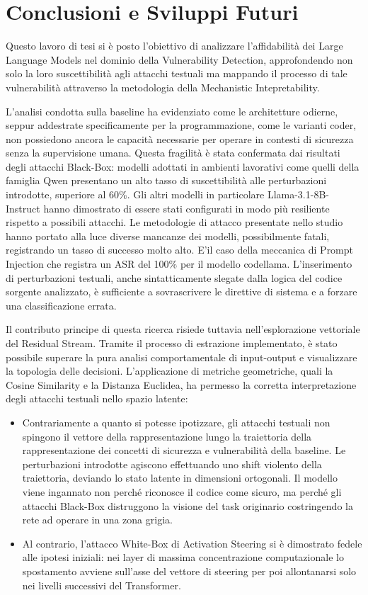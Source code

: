 \chapter{Conclusioni e Sviluppi Futuri}
Questo lavoro di tesi si è posto l'obiettivo di analizzare l'affidabilità dei Large Language Models nel dominio della Vulnerability Detection, approfondendo non solo la loro suscettibilità agli attacchi testuali ma mappando il processo di tale vulnerabilità attraverso la metodologia della Mechanistic Intepretability.

L'analisi condotta sulla baseline ha evidenziato come le architetture odierne, seppur addestrate specificamente per la programmazione, come le varianti coder, non possiedono ancora le capacità necessarie per operare in contesti di sicurezza senza la supervisione umana. Questa fragilità è stata confermata dai risultati degli attacchi Black-Box: modelli adottati in ambienti lavorativi come quelli della famiglia Qwen presentano un alto tasso di suscettibilità alle perturbazioni introdotte, superiore al 60\%. Gli altri modelli in particolare Llama-3.1-8B-Instruct hanno dimostrato di essere stati configurati in modo più resiliente rispetto a possibili attacchi.
Le metodologie di attacco presentate nello studio hanno portato alla luce diverse mancanze dei modelli, possibilmente fatali, registrando un tasso di successo molto alto. E'il caso della meccanica di Prompt Injection che registra un ASR del 100\% per il modello codellama.
L'inserimento di perturbazioni testuali, anche sintatticamente slegate dalla logica del codice sorgente analizzato, è sufficiente a sovrascrivere le direttive di sistema e a forzare una classificazione errata.

Il contributo principe di questa ricerca risiede tuttavia nell'esplorazione vettoriale del Residual Stream. Tramite il processo di estrazione implementato, è stato possibile superare la pura analisi comportamentale di input-output e visualizzare la topologia delle decisioni.
L'applicazione di metriche geometriche, quali la Cosine Similarity e la Distanza Euclidea, ha permesso la corretta interpretazione degli attacchi testuali nello spazio latente:
\begin{itemize}[noitemsep]
    \item Contrariamente a quanto si potesse ipotizzare, gli attacchi testuali non spingono il vettore della rappresentazione lungo la traiettoria della rappresentazione dei concetti di sicurezza e vulnerabilità della baseline. Le perturbazioni introdotte agiscono effettuando uno shift violento della traiettoria, deviando lo stato latente in dimensioni ortogonali. Il modello viene ingannato non perché riconosce il codice come sicuro, ma perché gli attacchi Black-Box distruggono la visione del task originario costringendo la rete ad operare in una zona grigia.
    \item Al contrario, l'attacco White-Box di Activation Steering si è dimostrato fedele alle ipotesi iniziali: nei layer di massima concentrazione computazionale lo spostamento avviene sull'asse del vettore di steering per poi allontanarsi solo nei livelli successivi del Transformer.
\end{itemize}

